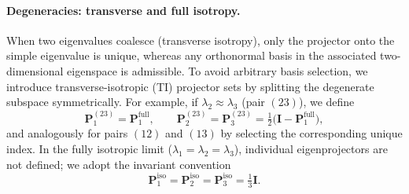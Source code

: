 \paragraph{Degeneracies: transverse and full isotropy.}
When two eigenvalues coalesce (transverse isotropy), only the projector onto the simple eigenvalue is unique,
whereas any orthonormal basis in the associated two-dimensional eigenspace is admissible.
To avoid arbitrary
basis selection, we introduce transverse-isotropic (TI) projector sets by splitting the degenerate subspace
symmetrically.
For example, if $\lambda_2\approx \lambda_3$ (pair $(23)$), we define
\begin{equation}
\label{eq:TI_split_23}
\mathbf{P}_1^{(23)}=\mathbf{P}_1^{\mathrm{full}},\qquad
\mathbf{P}_2^{(23)}=\mathbf{P}_3^{(23)}=\tfrac12\bigl(\mathbf{I}-\mathbf{P}_1^{\mathrm{full}}\bigr),
\end{equation}
and analogously for pairs $(12)$ and $(13)$ by selecting the corresponding unique index.
In the fully isotropic limit ($\lambda_1=\lambda_2=\lambda_3$), individual eigenprojectors are not defined;
we adopt the invariant convention
\begin{equation}
\label{eq:iso_split}
\mathbf{P}_1^{\mathrm{iso}}=\mathbf{P}_2^{\mathrm{iso}}=\mathbf{P}_3^{\mathrm{iso}}=\tfrac13\mathbf{I}.
\end{equation}


